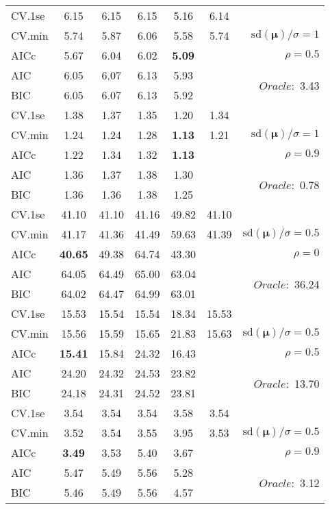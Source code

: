 \begin{table}
\begin{center}
\begin{tabular}{l*{5}{c}|r}
CV.1se & 6.15 & 6.15 & 6.15 & 5.16 & 6.14 & \\
CV.min & 5.74 & 5.87 & 6.06 & 5.58 & 5.74 &  $\mathrm{sd}(\mathbf{\mu})/\sigma=1$ \\
AICc & 5.67 & 6.04 & 6.02 & {\bf 5.09} & & $\rho=0.5$ \\
AIC & 6.05 & 6.07 & 6.13 & 5.93 & &  \multirow{2}{*}{$Oracle: $ 3.43} \\
BIC & 6.05 & 6.07 & 6.13 & 5.92 & &  \\
 \hline 
CV.1se & 1.38 & 1.37 & 1.35 & 1.20 & 1.34 & \\
CV.min & 1.24 & 1.24 & 1.28 & {\bf 1.13} & 1.21 &  $\mathrm{sd}(\mathbf{\mu})/\sigma=1$ \\
AICc & 1.22 & 1.34 & 1.32 & {\bf 1.13} & & $\rho=0.9$ \\
AIC & 1.36 & 1.37 & 1.38 & 1.30 & &  \multirow{2}{*}{$Oracle: $ 0.78} \\
BIC & 1.36 & 1.36 & 1.38 & 1.25 & &  \\
 \hline 
CV.1se & 41.10 & 41.10 & 41.16 & 49.82 & 41.10 & \\
CV.min & 41.17 & 41.36 & 41.49 & 59.63 & 41.39 &  $\mathrm{sd}(\mathbf{\mu})/\sigma=0.5$ \\
AICc & {\bf 40.65} & 49.38 & 64.74 & 43.30 & & $\rho=0$ \\
AIC & 64.05 & 64.49 & 65.00 & 63.04 & &  \multirow{2}{*}{$Oracle: $ 36.24} \\
BIC & 64.02 & 64.47 & 64.99 & 63.01 & &  \\
 \hline 
CV.1se & 15.53 & 15.54 & 15.54 & 18.34 & 15.53 & \\
CV.min & 15.56 & 15.59 & 15.65 & 21.83 & 15.63 &  $\mathrm{sd}(\mathbf{\mu})/\sigma=0.5$ \\
AICc & {\bf 15.41} & 15.84 & 24.32 & 16.43 & & $\rho=0.5$ \\
AIC & 24.20 & 24.32 & 24.53 & 23.82 & &  \multirow{2}{*}{$Oracle: $ 13.70} \\
BIC & 24.18 & 24.31 & 24.52 & 23.81 & &  \\
 \hline 
CV.1se & 3.54 & 3.54 & 3.54 & 3.58 & 3.54 & \\
CV.min & 3.52 & 3.54 & 3.55 & 3.95 & 3.53 &  $\mathrm{sd}(\mathbf{\mu})/\sigma=0.5$ \\
AICc & {\bf 3.49} & 3.53 & 5.40 & 3.67 & & $\rho=0.9$ \\
AIC & 5.47 & 5.49 & 5.56 & 5.28 & &  \multirow{2}{*}{$Oracle: $ 3.12} \\
BIC & 5.46 & 5.49 & 5.56 & 4.57 & &  \\
 \hline 
\end{tabular}
\end{center}
\vspace{-1cm}
\end{table}





